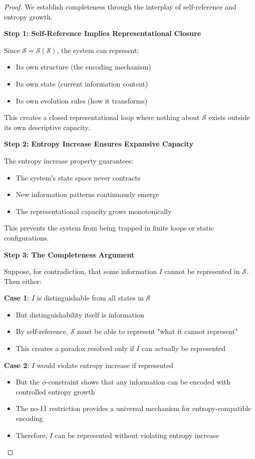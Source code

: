 \documentclass[12pt,letterpaper]{article}
\begin{document}
\begin{proof}
We establish completeness through the interplay of self-reference and entropy growth.

\textbf{Step 1: Self-Reference Implies Representational Closure}

Since $\mathcal{S} = \mathcal{S}(\mathcal{S})$, the system can represent:
\begin{itemize}
\item Its own structure (the encoding mechanism)
\item Its own state (current information content)
\item Its own evolution rules (how it transforms)
\end{itemize}

This creates a closed representational loop where nothing about $\mathcal{S}$ exists outside its own descriptive capacity.

\textbf{Step 2: Entropy Increase Ensures Expansive Capacity}

The entropy increase property guarantees:
\begin{itemize}
\item The system's state space never contracts
\item New information patterns continuously emerge
\item The representational capacity grows monotonically
\end{itemize}

This prevents the system from being trapped in finite loops or static configurations.

\textbf{Step 3: The Completeness Argument}

Suppose, for contradiction, that some information $I$ cannot be represented in $\mathcal{S}$. Then either:

\textbf{Case 1}: $I$ is distinguishable from all states in $\mathcal{S}$
\begin{itemize}
\item But distinguishability itself is information
\item By self-reference, $\mathcal{S}$ must be able to represent "what it cannot represent"
\item This creates a paradox resolved only if $I$ can actually be represented
\end{itemize}

\textbf{Case 2}: $I$ would violate entropy increase if represented
\begin{itemize}
\item But the $\phi$-constraint shows that any information can be encoded with controlled entropy growth
\item The no-11 restriction provides a universal mechanism for entropy-compatible encoding
\item Therefore, $I$ can be represented without violating entropy increase
\end{itemize}


\end{proof}
\end{document}
